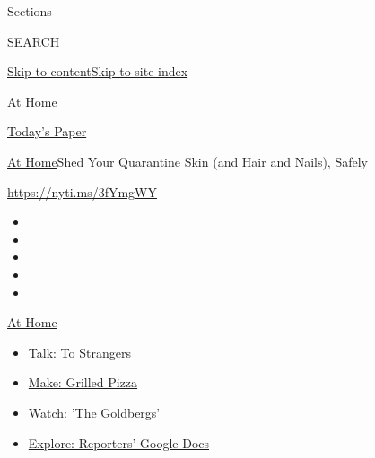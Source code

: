 Sections

SEARCH

\protect\hyperlink{site-content}{Skip to
content}\protect\hyperlink{site-index}{Skip to site index}

\href{https://www.nytimes3xbfgragh.onion/spotlight/at-home}{At Home}

\href{https://myaccount.nytimes3xbfgragh.onion/auth/login?response_type=cookie\&client_id=vi}{}

\href{https://www.nytimes3xbfgragh.onion/section/todayspaper}{Today's
Paper}

\href{/spotlight/at-home}{At Home}\textbar{}Shed Your Quarantine Skin
(and Hair and Nails), Safely

\url{https://nyti.ms/3fYmgWY}

\begin{itemize}
\item
\item
\item
\item
\item
\end{itemize}

\href{https://www.nytimes3xbfgragh.onion/spotlight/at-home?action=click\&pgtype=Article\&state=default\&region=TOP_BANNER\&context=at_home_menu}{At
Home}

\begin{itemize}
\tightlist
\item
  \href{https://www.nytimes3xbfgragh.onion/2020/08/03/well/family/the-benefits-of-talking-to-strangers.html?action=click\&pgtype=Article\&state=default\&region=TOP_BANNER\&context=at_home_menu}{Talk:
  To Strangers}
\item
  \href{https://www.nytimes3xbfgragh.onion/2020/08/01/at-home/coronavirus-make-pizza-on-a-grill.html?action=click\&pgtype=Article\&state=default\&region=TOP_BANNER\&context=at_home_menu}{Make:
  Grilled Pizza}
\item
  \href{https://www.nytimes3xbfgragh.onion/2020/07/31/arts/television/goldbergs-abc-stream.html?action=click\&pgtype=Article\&state=default\&region=TOP_BANNER\&context=at_home_menu}{Watch:
  'The Goldbergs'}
\item
  \href{https://www.nytimes3xbfgragh.onion/interactive/2020/at-home/even-more-reporters-editors-diaries-lists-recommendations.html?action=click\&pgtype=Article\&state=default\&region=TOP_BANNER\&context=at_home_menu}{Explore:
  Reporters' Google Docs}
\end{itemize}

